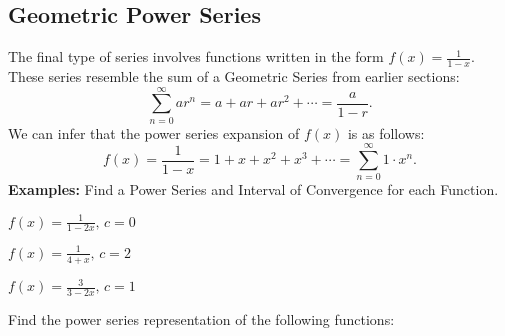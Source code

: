 \subsection*{Geometric Power Series}
The final type of series involves functions written in the form $\displaystyle f(x)=\frac{1}{1-x}$. These series resemble the sum of a Geometric Series from earlier sections: \[\displaystyle\sum_{n=0}^{\infty}ar^n=a+ar+ar^2+\cdots=\frac{a}{1-r}.\] We can infer that the power series expansion of $f(x)$ is as follows:
\[f(x)=\frac{1}{1-x}=1+x+x^2+x^3+\cdots=\sum_{n=0}^{\infty}1\cdot x^n.\]
\noindent\textbf{Examples:} Find a Power Series and Interval of Convergence for each Function.
\begin{questions}
    \begin{minipage}{0.45\linewidth}
        \question $\displaystyle f(x)=\frac{1}{1-2x},\, c=0$
    \end{minipage}
    \hfill
    \begin{minipage}{0.45\linewidth}
        \question $\displaystyle f(x)=\frac{1}{4+x},\,c=2$
    \end{minipage}

    
    
    \newpage

    \question $\displaystyle f(x)=\frac{3}{3-2x},\,c=1$
    
    \question Find the power series representation of the following functions:

\end{questions}

\newpage
